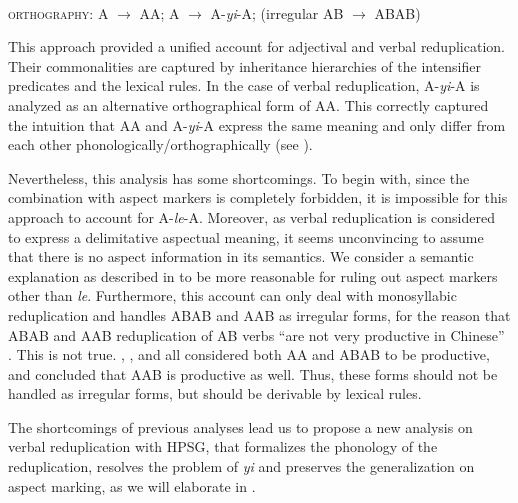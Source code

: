 \ea\label{avm:fsb-redup-v}
\\
\textsc{orthography}: A $\to$ AA; A $\to$ A-\textit{yi}-A; (irregular AB $\to$ ABAB)
\z

This approach provided a unified account for adjectival and verbal reduplication.
Their commonalities are captured by inheritance hierarchies of the intensifier predicates and the lexical rules.
In the case of verbal reduplication, A-\textit{yi}-A is analyzed as an alternative orthographical form of AA.
This correctly captured the intuition that AA and A-\textit{yi}-A express the same meaning and only differ from each other phonologically/orthographically (see ).

Nevertheless, this analysis has some shortcomings.
To begin with, since the combination with aspect markers is completely forbidden, it is impossible for this approach to account for A\hyp{}\textit{le}\hyp{}A.
Moreover, as verbal reduplication is  considered to express a delimitative aspectual meaning,
it seems unconvincing to assume that there is no aspect information in its semantics.
We consider a semantic explanation as described in   to be more reasonable for ruling out aspect markers other than \textit{le}.
Furthermore, this account can only deal with monosyllabic reduplication and handles ABAB and AAB as irregular forms, for the reason that ABAB and AAB reduplication of AB verbs ``are not very productive in Chinese'' \citep[102]{FanSongBond2015}.
This is not true. 
\citet[33]{Xing2000stat}, \citet[161]{BascianoMelloni2017}, \citet[329]{MelloniBasciano2018} and  \citet[Sec. 3.1]{Xie2020}  all considered both AA and ABAB to be productive,
and \citet[36]{Xing2000stat} concluded that AAB is productive as well.
Thus, these forms should not be handled as  irregular forms, but should be derivable by lexical rules.


 
 


The shortcomings of previous analyses lead us to propose a new analysis on verbal reduplication with {HPSG}, 
that formalizes the phonology of the reduplication, resolves the problem of \textit{yi} and preserves the generalization on aspect marking, 
as we will elaborate in . 

